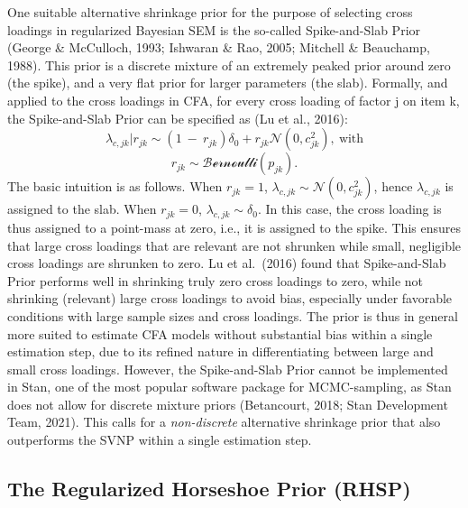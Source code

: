 \documentclass[
  man, donotrepeattitle,floatsintext]{apa6}
\begin{document}
One suitable alternative shrinkage prior for the purpose of selecting
cross loadings in regularized Bayesian SEM is the so-called
Spike-and-Slab Prior (George \& McCulloch, 1993; Ishwaran \& Rao, 2005; Mitchell \& Beauchamp, 1988). This prior is a discrete mixture of an
extremely peaked prior around zero (the spike), and a very flat prior
for larger parameters (the slab). Formally, and applied to the cross
loadings in CFA, for every cross loading of factor j on item k, the
Spike-and-Slab Prior can be specified as (Lu et al., 2016):
\[\lambda_{c,jk} |r_{jk} \sim (1 \ - \ r_{jk})\delta_0 + r_{jk} \mathcal{N}(0, c^2_{jk}) , \ \text{with}\]
\[r_{jk} \sim \mathcal{Bernoulli}(p_{jk}).\] The basic intuition is as
follows. When \(r_{jk} = 1\),
\(\lambda_{c,jk} \sim \mathcal{N}(0, c^2_{jk})\), hence \(\lambda_{c,jk}\)
is assigned to the slab. When \(r_{jk} = 0\),
\(\lambda_{c,jk} \sim \delta_0\). In this case, the cross loading is thus
assigned to a point-mass at zero, i.e., it is assigned to the spike.
This ensures that large cross loadings that are relevant are not
shrunken while small, negligible cross loadings are shrunken to zero. Lu
et al.~(2016) found that Spike-and-Slab Prior performs well in shrinking
truly zero cross loadings to zero, while not shrinking (relevant) large
cross loadings to avoid bias, especially under favorable conditions with
large sample sizes and cross loadings. The prior is thus in general more
suited to estimate CFA models without substantial bias within a single
estimation step, due to its refined nature in differentiating between
large and small cross loadings. However, the Spike-and-Slab Prior cannot
be implemented in Stan, one of the most popular software package for
MCMC-sampling, as Stan does not allow for discrete mixture priors
(Betancourt, 2018; Stan Development Team, 2021). This
calls for a \emph{non-discrete} alternative shrinkage prior that also
outperforms the SVNP within a single estimation step.

\hypertarget{the-regularized-horseshoe-prior-rhsp}{%
\subsection{The Regularized Horseshoe Prior (RHSP)}\label{the-regularized-horseshoe-prior-rhsp}}
\end{document}
